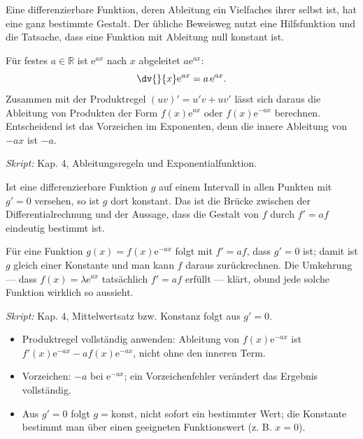 

Eine differenzierbare Funktion, deren Ableitung ein Vielfaches ihrer selbst
ist, hat eine ganz bestimmte Gestalt. Der übliche Beweisweg nutzt eine
Hilfsfunktion und die Tatsache, dass eine Funktion mit Ableitung null konstant
ist.

\begin{werkzeugkasten}
Für festes $a\in\mathbb R$ ist $\mathrm e^{ax}$ nach $x$ abgeleitet
$a\mathrm e^{ax}$:
\begin{equation}
  \dv{}{x}\mathrm e^{ax}=a\,\mathrm e^{ax}.
\end{equation}
Zusammen mit der Produktregel $(uv)'=u'v+uv'$ lässt sich daraus die Ableitung
von Produkten der Form $f(x)\mathrm e^{ax}$ oder $f(x)\mathrm e^{-ax}$
berechnen. Entscheidend ist das Vorzeichen im Exponenten, denn die innere
Ableitung von $-ax$ ist $-a$.

\textit{Skript:} Kap. 4, Ableitungsregeln und Exponentialfunktion.
\end{werkzeugkasten}

\begin{werkzeugkasten}
Ist eine differenzierbare Funktion $g$ auf einem Intervall in allen Punkten
mit $g'=0$ versehen, so ist $g$ dort konstant. Das ist die Brücke zwischen
der Differentialrechnung und der Aussage, dass die Gestalt von $f$ durch
$f'=af$ eindeutig bestimmt ist.

Für eine Funktion $g(x)=f(x)\mathrm e^{-ax}$ folgt mit $f'=af$, dass $g'=0$
ist; damit ist $g$ gleich einer Konstante und man kann $f$ daraus
zurückrechnen. Die Umkehrung — dass $f(x)=\lambda\mathrm e^{ax}$ tatsächlich
$f'=af$ erfüllt — klärt, obund jede solche Funktion wirklich so aussieht.

\textit{Skript:} Kap. 4, Mittelwertsatz bzw. Konstanz folgt aus $g'=0$.
\end{werkzeugkasten}

\begin{achtung}
\begin{itemize}
  \item Produktregel vollständig anwenden: Ableitung von $f(x)\mathrm e^{-ax}$
        ist $f'(x)\mathrm e^{-ax}-a f(x)\mathrm e^{-ax}$, nicht ohne den
        inneren Term.
  \item Vorzeichen: $-a$ bei $\mathrm e^{-ax}$; ein Vorzeichenfehler verändert
        das Ergebnis vollständig.
  \item Aus $g'=0$ folgt $g=\text{konst}$, nicht sofort ein bestimmter Wert;
        die Konstante bestimmt man über einen geeigneten Funktionswert (z. B.
        $x=0$).
\end{itemize}
\end{achtung}
